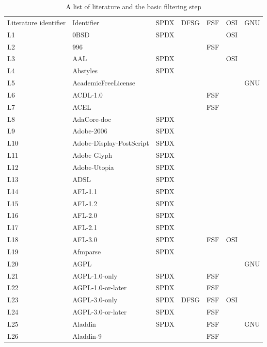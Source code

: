 
\begin{longtable}[h]{m{2cm} | m{7cm} | c | c | c | c | c}
  \caption{A list of literature and the basic filtering step} \label{table:appendix:a} \\
  \hline
  Literature identifier & Identifier & SPDX & DFSG & FSF & OSI & GNU \\
  L1 & 0BSD & SPDX &  &  & OSI &  \\
  L2 & 996 &  &  & FSF &  &  \\
  L3 & AAL & SPDX &  &  & OSI &  \\
  L4 & Abstyles & SPDX &  &  &  &  \\
  L5 & AcademicFreeLicense &  &  &  &  & GNU \\
  L6 & ACDL-1.0 &  &  & FSF &  &  \\
  L7 & ACEL &  &  & FSF &  &  \\
  L8 & AdaCore-doc & SPDX &  &  &  &  \\
  L9 & Adobe-2006 & SPDX &  &  &  &  \\
  L10 & Adobe-Display-PostScript & SPDX &  &  &  &  \\
  L11 & Adobe-Glyph & SPDX &  &  &  &  \\
  L12 & Adobe-Utopia & SPDX &  &  &  &  \\
  L13 & ADSL & SPDX &  &  &  &  \\
  L14 & AFL-1.1 & SPDX &  &  &  &  \\
  L15 & AFL-1.2 & SPDX &  &  &  &  \\
  L16 & AFL-2.0 & SPDX &  &  &  &  \\
  L17 & AFL-2.1 & SPDX &  &  &  &  \\
  L18 & AFL-3.0 & SPDX &  & FSF & OSI &  \\
  L19 & Afmparse & SPDX &  &  &  &  \\
  L20 & AGPL &  &  &  &  & GNU \\
  L21 & AGPL-1.0-only & SPDX &  & FSF &  &  \\
  L22 & AGPL-1.0-or-later & SPDX &  & FSF &  &  \\
  L23 & AGPL-3.0-only & SPDX & DFSG & FSF & OSI &  \\
  L24 & AGPL-3.0-or-later & SPDX &  & FSF &  &  \\
  L25 & Aladdin & SPDX &  & FSF &  & GNU \\
  L26 & Aladdin-9 &  &  & FSF &  &  \\

\end{longtable}
